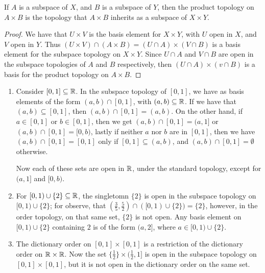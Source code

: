 \begin{theorem}\label{1.5.4}
    If $A$ is a subspace of  $X$, and  $B$ is a subspace of  $Y$, then the product topology on 
     $A \times B$ is the topology that  $A \times B$ inherits as a subspace of  $X \times Y$.
\end{theorem}
\begin{proof}
    We have that $U \times V$ is the basis element for $X \times Y$, with  $U$ open in  $X$, and 
    $V$ open in  $Y$. Thus  $(U \times V) \cap (A \times B)=(U \cap A) \times (V \cap B)$ is a basis element 
    for the subspace topology on $X \times Y$. Since  $U \cap A$ and  $V \cap B$ are open in the subspace 
    topologies of  $A$ and  $B$ respectively, then  $(U  \cap A) \times (v \cap B)$ is a basis for 
    the product topology on $A \times B$.
\end{proof}

\begin{example}
    \begin{enumerate}[label=(\arabic*)]
        \item Consider $[0,1] \subseteq \mathbb{R}$. In the subspace topology of  $[0,1]$, we have as 
            basis elements of the form $(a,b) \cap [0,1]$, with $(a,b) \subseteq \mathbb{R}$. If we have 
            that  $(a,b) \subseteq [0,1]$, then $(a,b) \cap [0,1]=(a,b)$. On the other hand, if $a \in [0,1]$ 
            or $b \in [0,1]$, then we get $(a,b) \cap [0,1]=(a,1]$ or $(a,b) \cap [0,1]=[0,b)$, lastly if neither 
            $a$ nor  $b$ are in $[0,1]$, then we have $(a,b) \cap [0,1]=[0,1]$ only if  $[0,1] \subseteq (a,b)$, and 
            $(a,b) \cap [0,1]=\emptyset$ otherwise.

            Now each of these sets are open in $\mathbb{R}$, under the standard topology, except for $(a,1]$ and 
            $[0,b)$.

        \item For  $[0,1) \cup \{2\} \subseteq \mathbb{R}$, the singletomn  $\{2\}$ is open in the 
            subspace topology on $[0,1) \cup \{2\}$; for observe, that $(\frac{3}{5},\frac{5}{2}) \cap 
            ([0,1) \cup \{2\})=\{2\}$, however, in the order topology, on that same set, $\{2\}$ is not open.
            Any basis element on  $[0,1) \cup \{2\}$ containing  $2$ is of the form $(a,2]$, where 
            $a \in [0,1) \cup \{2\}$.

        \item The dictionary order on $[0,1] \times [0,1]$ is a restriction of the dictionary order 
            on $\mathbb{R} \times \mathbb{R}$. Now the set  $\{\frac{1}{2}\} \times (\frac{1}{2},1]$ is open in the 
            subspace topology on $[0,1] \times [0,1]$, but it is not open in the dictionary order on the 
            same set.
    \end{enumerate}		
\end{example}

